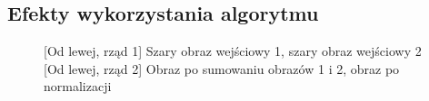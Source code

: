 \documentclass[a4paper,12pt, titlepage]{report}
\begin{document}
\subsection*{Efekty wykorzystania algorytmu}
\begin{figure}[h]
    \centering
    \qquad
    \caption{[Od lewej, rząd 1] Szary obraz wejściowy 1, szary obraz wejściowy 2 [Od lewej, rząd 2] Obraz po sumowaniu obrazów 1 i 2, obraz po normalizacji}%
    \label{fig:geo_after_grey1}%
\end{figure}
\end{document}
